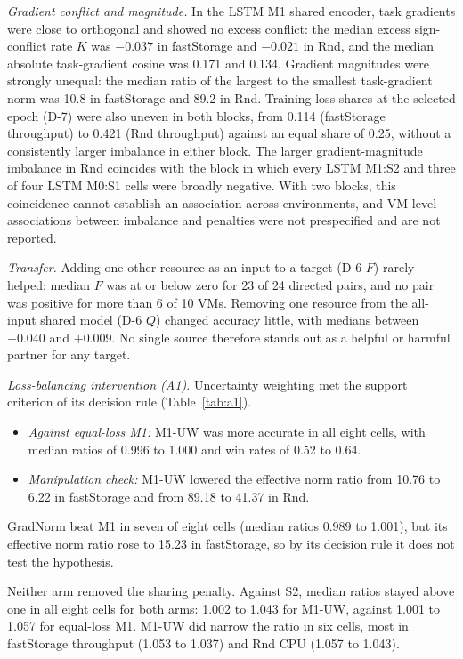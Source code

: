 \documentclass[5p,twocolumn]{elsarticle}
\begin{document}
\emph{Gradient conflict and magnitude.} In the LSTM M1 shared encoder, task
gradients were close to orthogonal and showed no excess conflict: the median
excess sign-conflict rate $K$ was $-0.037$ in fastStorage and $-0.021$ in Rnd,
and the median absolute task-gradient cosine was 0.171 and 0.134. Gradient
magnitudes were strongly unequal: the median ratio of the largest to the
smallest task-gradient norm was 10.8 in fastStorage and 89.2 in Rnd.
Training-loss shares at the selected epoch (D-7) were also uneven in both
blocks, from 0.114 (fastStorage throughput) to 0.421 (Rnd throughput)
against an equal share of 0.25, without a consistently larger imbalance in
either block. The larger gradient-magnitude imbalance in Rnd coincides with
the block in
which every LSTM M1:S2 and three of four LSTM M0:S1 cells were broadly
negative. With two blocks, this coincidence cannot establish an association
across environments, and VM-level associations between imbalance and
penalties were not prespecified and are not reported.

\emph{Transfer.} Adding one other resource as an input to a target (D-6 $F$)
rarely helped: median $F$ was at or below zero for 23 of 24 directed pairs,
and no pair was positive for more than 6 of 10 VMs. Removing one resource from
the all-input shared model (D-6 $Q$) changed accuracy little, with medians
between $-0.040$ and $+0.009$. No single source therefore stands out as a
helpful or harmful partner for any target.

\emph{Loss-balancing intervention (A1).} Uncertainty weighting met the
support criterion of its decision rule (Table~\ref{tab:a1}).
\begin{itemize}
  \item \emph{Against equal-loss M1:} M1-UW was more accurate in all eight
    cells, with median ratios of 0.996 to 1.000 and win rates of 0.52 to
    0.64.
  \item \emph{Manipulation check:} M1-UW lowered the effective norm ratio from
    10.76 to 6.22 in fastStorage and from 89.18 to 41.37 in Rnd.
\end{itemize}
GradNorm beat M1 in seven of eight cells (median ratios 0.989 to 1.001), but
its effective norm ratio rose to 15.23 in fastStorage, so by its decision rule
it does not test the hypothesis.

Neither arm removed the sharing penalty. Against S2, median ratios stayed
above one in all eight cells for both arms: 1.002 to 1.043 for M1-UW, against
1.001 to 1.057 for equal-loss M1. M1-UW did narrow the ratio in six cells,
most in fastStorage throughput (1.053 to 1.037) and Rnd CPU (1.057 to 1.043).
\end{document}
